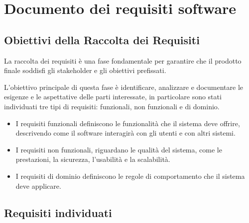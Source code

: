 \chapter{Documento dei requisiti software}

\section{Obiettivi della Raccolta dei Requisiti}
La raccolta dei requisiti è una fase fondamentale per garantire che il prodotto finale soddisfi gli stakeholder e gli obiettivi prefissati.

L'obiettivo principale di questa fase è identificare, analizzare e documentare le esigenze e le aspettative delle parti interessate, in particolare sono stati individuati tre tipi di requisiti: funzionali, non funzionali e di dominio.
\begin{itemize}
	\item I requisiti funzionali definiscono le funzionalità che il sistema deve offrire, descrivendo come il software interagirà con gli utenti e con altri sistemi.
	\item I requisiti non funzionali, riguardano le qualità del sistema, come le prestazioni, la sicurezza, l'usabilità e la scalabilità.
	\item I requisiti di dominio definiscono le regole di comportamento che il sistema deve applicare.
\end{itemize}

\newpage

\section{Requisiti individuati}
